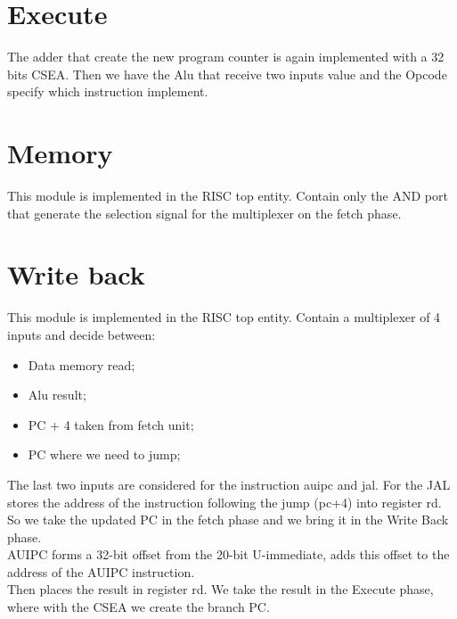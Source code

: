 \section{Execute}
The adder that create the new program counter is again implemented with a 32 bits CSEA.
Then we have the Alu that receive two inputs value and the Opcode specify which instruction implement.
\section{Memory}
This module is implemented in the RISC top entity. Contain only the AND port that generate the selection signal for the multiplexer on the fetch phase.
\section{Write back}
This module is implemented in the RISC top entity. Contain a multiplexer of 4 inputs and decide between:
\begin{itemize}
	\item Data memory read;
	\item Alu result;
	\item PC + 4 taken from fetch unit;
	\item PC where we need to jump;
\end{itemize}
The last two inputs are considered for the instruction auipc and jal.
For the JAL stores the address of the instruction following the jump (pc+4) into register rd.\\
So we take the updated PC in the fetch phase and we bring it in the Write Back phase.\\
AUIPC forms a 32-bit offset from the 20-bit U-immediate, adds this offset to the address of the AUIPC instruction.\\
Then places the result in register rd. 
We take the result in the Execute phase, where with the CSEA we create the branch PC.